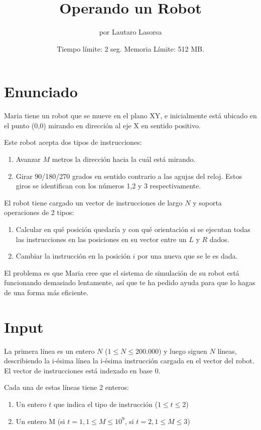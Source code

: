 \documentclass{article}
\title{Operando un Robot}
\author{por Lautaro Lasorsa}
\date{Tiempo límite: 2 seg. Memoria Límite: 512 MB.}
\begin{document}
 
\maketitle
 
\section{Enunciado}
Maria tiene un robot que se mueve en el plano XY, e inicialmente está ubicado en el punto (0,0) mirando en dirección al eje X en sentido positivo.
 
Este robot acepta dos tipos de instrucciones:
 
\begin{enumerate}
    \item Avanzar $M$ metros la dirección hacia la cuál está mirando.
    
    \item Girar 90/180/270 grados en sentido contrario a las agujas del reloj. Estos giros se identifican con los números 1,2 y 3 respectivamente.
\end{enumerate}
 
El robot tiene cargado un vector de instrucciones de largo $N$ y soporta operaciones de 2 tipos:
 
\begin{enumerate}
    \item Calcular en qué posición quedaría y con qué orientación si se ejecutan todas las instrucciones en las posiciones en su vector entre un $L$ y $R$ dados.
    \item Cambiar la instrucción en la posición $i$ por una nueva que se le es dada. 
\end{enumerate}
 
El problema es que Maria cree que el sistema de simulación de su robot está funcionando demasiado lentamente, así que te ha pedido ayuda para que lo hagas de una forma más eficiente.
 
\section{Input}
 
La primera línea es un entero $N$ ($1 \leq N \leq 200.000$) y luego siguen $N$ líneas, describiendo la i-ésima línea la i-ésima instrucción cargada en el vector del robot. El vector de instrucciones está indexado en base 0.
 
Cada una de estas líneas tiene 2 enteros:
\begin{enumerate}
    \item Un entero $t$ que indica el tipo de instrucción ($1\leq t \leq2$)
    \item Un entero M (si $t = 1, 1\leq M \leq 10^9$, si $t = 2, 1 \leq M \leq 3$)
\end{enumerate}
 
\end{document}
